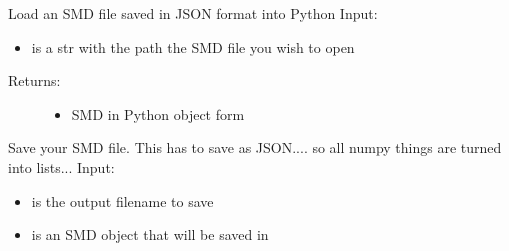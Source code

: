 \documentclass[letterpaper,10pt,english]{sphinxmanual}
\begin{document}
\begin{fulllineitems}
\label{code_smd:smd.load}
Load an SMD file saved in JSON format into Python
Input:
\begin{itemize}
\item {} 
 is a str with the path the SMD file you wish to open

\end{itemize}
\begin{description}
\item[{Returns:}] \leavevmode\begin{itemize}
\item {} 
SMD in Python object form

\end{itemize}

\end{description}

\end{fulllineitems}


\begin{fulllineitems}
\label{code_smd:smd.save}
Save your SMD file. This has to save as JSON.... so all numpy things are turned into lists...
Input:
\begin{itemize}
\item {} 
 is the output filename to save

\item {} 
 is an SMD object that will be saved in 

\end{itemize}

\end{fulllineitems}
\end{document}
